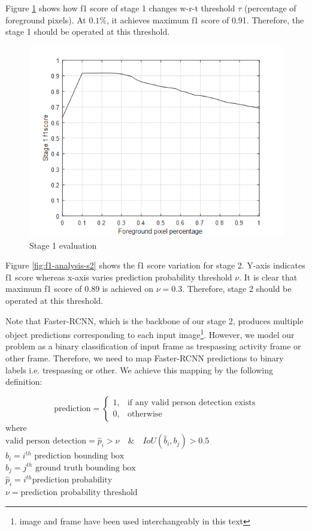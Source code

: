 Figure \ref{fig:f1-analysis-mog} shows how f1 score of stage 1 changes w-r-t threshold $\tau$ (percentage of foreground pixels). At $0.1\%$, it achieves maximum f1 score of 0.91. Therefore, the stage 1 should be operated at this threshold.

\begin{figure}
    \centering
    \includegraphics[width=\linewidth]{images/f1-analysis-mog.png}
    \caption{Stage 1 evaluation}
    \label{fig:f1-analysis-mog}
\end{figure}

Figure \ref{fig:f1-analysis-s2} shows the f1 score variation for stage 2. Y-axis indicates f1 score whereas x-axis varies prediction probability threshold $\nu$. It is clear that maximum f1 score of 0.89 is achieved on $\nu=0.3$. Therefore, stage 2 should be operated at this threshold.

Note that Faster-RCNN, which is the backbone of our stage 2, produces multiple object predictions corresponding to each input image\footnote{image and frame have been used interchangeably in this text}. However, we model our problem as a binary classification of input frame as trespassing activity frame or other frame. Therefore, we need to map Faster-RCNN predictions to binary labels i.e. trespassing or other. We achieve this mapping by the following definition:

$$
\text{prediction} = 
\begin{cases}
1, &    \text{if any valid person detection exists} \\
0, &    \text{otherwise}
\end{cases}
$$
where \\
$\text{valid person detection} = \hat{p}_i>\nu \quad \& \quad IoU(\hat{b}_i,b_j)>0.5$ \\
$\hat{b}_i =i^{th} \text{ prediction bounding box}$ \\
$b_j =j^{th} \text{ ground truth bounding box}$ \\
$\hat{p}_i = i^{th} \text{prediction probability}$ \\
$\nu =  \text{prediction probability threshold}$

